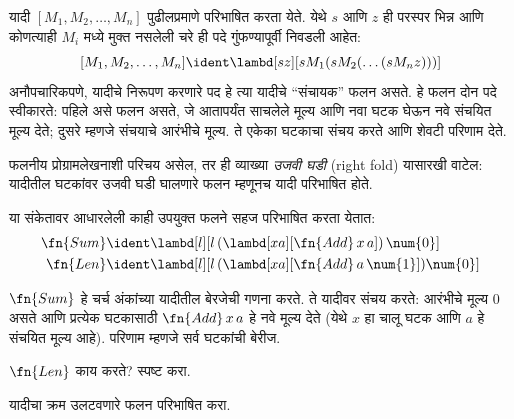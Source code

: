 \documentclass[../../../include/open-logic-section]{subfiles}
\begin{document}

यादी $[M_1, M_2, \ldots, M_n]$ पुढीलप्रमाणे परिभाषित करता येते.
येथे $s$ आणि $z$ ही परस्पर भिन्न आणि कोणत्याही $M_i$ मध्ये
मुक्त नसलेली चरे ही पदे गुंफण्यापूर्वी निवडली आहेत:
\[
  [M_1, M_2, \ldots, M_n] \ident \lambd[sz][s M_1 (s M_2 (\ldots (s M_n z)))]
\]
अनौपचारिकपणे, यादीचे निरूपण करणारे पद हे त्या यादीचे
“संचायक” फलन असते. हे फलन दोन पदे स्वीकारते: पहिले
असे फलन असते, जे आतापर्यंत साचलेले मूल्य आणि नवा घटक
घेऊन नवे संचयित मूल्य देते; दुसरे म्हणजे संचयाचे आरंभीचे
मूल्य. ते एकेका घटकाचा संचय करते आणि शेवटी परिणाम देते.

\begin{digress}
  फलनीय प्रोग्रामलेखनाशी परिचय असेल, तर ही व्याख्या
  \emph{उजवी घडी} (right fold) यासारखी वाटेल:
  यादीतील घटकांवर उजवी घडी घालणारे फलन म्हणूनच
  यादी परिभाषित होते.
\end{digress}

या संकेतावर आधारलेली काही उपयुक्त फलने सहज परिभाषित
करता येतात:
\begin{align*}
  \fn{Sum} & \ident
  \lambd[l][l \, (\lambd[xa][\fn{Add} \, x \, a])\,  \num{0}]\\
  \fn{Len} & \ident
  \lambd[l][l \, (\lambd[xa][\fn{Add} \, a \, \num{1}]) \num{0}]
\end{align*}

$\fn{Sum}$ हे चर्च अंकांच्या यादीतील बेरजेची गणना
करते. ते यादीवर संचय करते: आरंभीचे मूल्य
$\num{0}$ असते आणि प्रत्येक घटकासाठी
$\fn{Add} \, x\, a$ हे नवे मूल्य देते
(येथे $x$ हा चालू घटक आणि $a$ हे संचयित मूल्य आहे).
परिणाम म्हणजे सर्व घटकांची बेरीज.

\begin{prob}
  $\fn{Len}$ काय करते? स्पष्ट करा.
\end{prob}

\begin{prob}
  यादीचा क्रम उलटवणारे फलन परिभाषित करा.
\end{prob}
\end{document}
